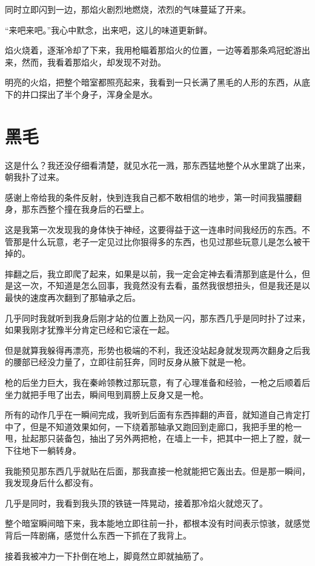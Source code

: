 同时立即闪到一边，那焰火剧烈地燃烧，浓烈的气味蔓延了开来。

“来吧来吧。”我心中默念，出来吧，这儿的味道更新鲜。

焰火烧着，逐渐冷却了下来，我用枪瞄着那焰火的位置，一边等着那条鸡冠蛇游出来，然而，我看着那焰火，却发现不对劲。

明亮的火焰，把整个暗室都照亮起来，我看到一只长满了黑毛的人形的东西，从底下的井口探出了半个身子，浑身全是水。

\chapter{黑毛}

这是什么？我还没仔细看清楚，就见水花一溅，那东西猛地整个从水里跳了出来，朝我扑了过来。

感谢上帝给我的条件反射，快到连我自己都不敢相信的地步，第一时间我猫腰翻身，那东西整个撞在我身后的石壁上。

这是我第一次发现我的身体快于神经，这要得益于这一连串时间我经历的东西。不管那是什么玩意，老子一定见过比你狠得多的东西，也见过那些玩意儿是怎么被干掉的。

摔翻之后，我立即爬了起来，如果是以前，我一定会定神去看清那到底是什么，但是这一次，不知道是怎么回事，我竟然没有去看，虽然我很想扭头，但是我还是以最快的速度再次翻到了那轴承之后。

几乎同时我就听到我身后刚才站的位置上劲风一闪，那东西几乎是同时扑了过来，如果我刚才犹豫半分肯定已经和它滚在一起。

但是就算我躲得再漂亮，形势也极端的不利，我还没站起身就发现两次翻身之后我的腰部已经没力量了，立即往前狂奔，同时反身从腋下就是一枪。

枪的后坐力巨大，我在秦岭领教过那玩意，有了心理准备和经验，一枪之后顺着后坐力就把手甩了出去，瞬间甩到肩膀上反身又是一枪。

所有的动作几乎在一瞬间完成，我听到后面有东西摔翻的声音，就知道自己肯定打中了，但是不知道效果如何，一下绕着那轴承又跑回到走廊口，我把手里的枪一甩，扯起那只装备包，抽出了另外两把枪，在墙上一卡，把其中一把上了膛，就一下往地下一躺转身。

我能预见那东西几乎就贴在后面，那我直接一枪就能把它轰出去。但是那一瞬间，我发现身后什么都没有。

几乎是同时，我看到我头顶的铁链一阵晃动，接着那冷焰火就熄灭了。

整个暗室瞬间暗下来，我本能地立即往前一扑，都根本没有时间表示惊骇，就感觉背后一阵剧痛，感觉什么东西一下抓在了我背上。

接着我被冲力一下扑倒在地上，脚竟然立即就抽筋了。


